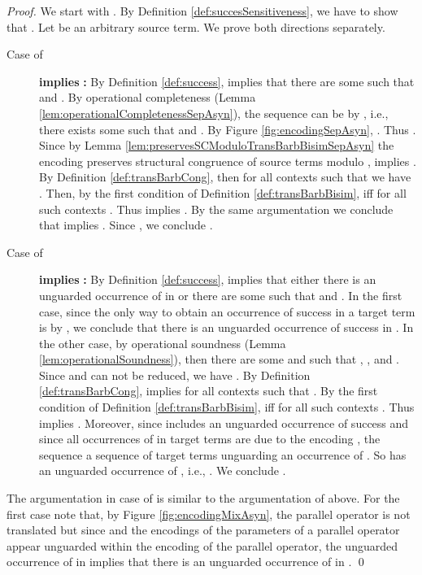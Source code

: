 \documentclass[]{llncs}
\begin{document}
\begin{proof}
	We start with . By Definition \ref{def:succesSensitiveness}, we have to show that . Let  be an arbitrary source term. We prove both directions separately.
	\begin{description}
		\item[Case of]  \textbf{implies} \textbf{:} By Definition \ref{def:success},  implies that there are some  such that  and . By operational completeness (Lemma \ref{lem:operationalCompletenessSepAsyn}), the sequence  can be \simulated by , i.e., there exists some  such that  and . By Figure \ref{fig:encodingSepAsyn}, . Thus . Since by Lemma \ref{lem:preservesSCModuloTransBarbBisimSepAsyn} the encoding  preserves structural congruence of source terms modulo ,  implies . By Definition \ref{def:transBarbCong}, then for all contexts  such that  we have . Then, by the first condition of Definition \ref{def:transBarbBisim},  iff  for all such contexts . Thus  implies . By the same argumentation we conclude that  implies . Since , we conclude .
		\item[Case of]  \textbf{implies} \textbf{:} By Definition \ref{def:success},  implies that either there is an unguarded occurrence of  in  or there are some  such that  and . In the first case, since the only way to obtain an occurrence of success in a target term is by , we conclude that there is an unguarded occurrence of success in . In the other case, by operational soundness (Lemma \ref{lem:operationalSoundness}), then there are some  and  such that , , and . Since  and  can not be reduced, we have . By Definition \ref{def:transBarbCong},  implies  for all contexts  such that . By the first condition of Definition \ref{def:transBarbBisim},  iff  for all such contexts . Thus  implies . Moreover, since  includes an unguarded occurrence of success and since all occurrences of  in target terms are due to the encoding , the sequence  \simulates a sequence  of target terms unguarding an occurrence of . So  has an unguarded occurrence of , i.e., . We conclude .
	\end{description}
	The argumentation in case of  is similar to the argumentation of  above. For the first case note that, by Figure \ref{fig:encodingMixAsyn}, the parallel operator is not translated \cleanly but since  and the encodings of the parameters of a parallel operator appear unguarded within the encoding of the parallel operator, the unguarded occurrence of  in  implies that there is an unguarded occurrence of  in .
	\qed
\end{proof}
\end{document}
